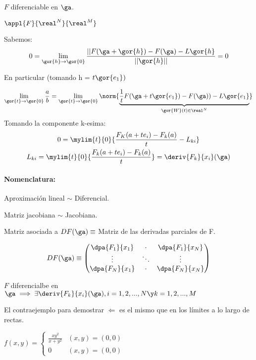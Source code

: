 \obs
$F$ diferenciable en $\ga$.

$\appl{F}{\real^N}{\real^M}$

Sabemos:
 $$0 = \lim_{\gor{h} \rightarrow \gor{0}} \frac{||F(\ga+\gor{h}) - F(\ga) - L\gor{h}}{||\gor{h}||} = 0 $$
 
 En particular (tomando  h = $t \gor{e_1})$

$$ \lim_{\gor{t} \rightarrow \gor{0}}\frac{a}{b} = \lim_{\gor{t} \rightarrow \gor{0}}\norm{\underbrace{\frac{1}{t} F(\ga+t\gor{e_1})-F(\ga))-L\gor{e_1}}_{\gor{W}(t)\in\real^N}}$$
 Tomando la componente k-esima:
\begin{gather*}
 0 = \mylim{t}{0}{\frac{F_K(a+te_i)-F_k(a)}{t} - L_{ki}}\\
 L_{ki} = \mylim{t}{0} {\frac{F_k(a+te_i) - F_k(a)}{t}} = \deriv{ F_k}{x_i}(\ga)
\end{gather*}

\paragraph{Nomenclatura: }
Aproximación lineal $\sim$ Diferencial.

Matriz jacobiana $\sim$ Jacobiana.

\begin{theorem}
 Matriz asociada a $DF(\ga) \equiv $ Matriz de las derivadas parciales de F.
 
 $$DF(\ga) \equiv \begin{pmatrix}
                \dpa{F_1}{x_1} & \cdot & \dpa{F_1}{x_N}\\
                \vdots& \ddots & \vdots\\
                \dpa{F_N}{x_1} & \cdot & \dpa{F_N}{x_N}
                \end{pmatrix}
$$
\end{theorem}

\begin{theorem}
 $F$ diferencialbe en $\ga \implies \exists \deriv{F_k}{x_i}(\ga), i=1,2,...,N \y k = 1,2,...,M$
\end{theorem}

El contraejemplo para demostrar $\Leftarrow$ es el mismo que en los límites a lo largo de rectas.

$f(x,y) = \left\{ \begin{matrix}

\frac{xy^2}{x+y^2} & (x,y) = (0,0) \\ 
0 & (x,y)=(0,0)
           
          \end{matrix}\right.
$
